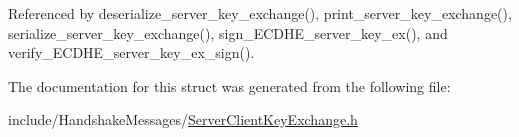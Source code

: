 Referenced by deserialize\+\_\+server\+\_\+key\+\_\+exchange(), print\+\_\+server\+\_\+key\+\_\+exchange(), serialize\+\_\+server\+\_\+key\+\_\+exchange(), sign\+\_\+\+E\+C\+D\+H\+E\+\_\+server\+\_\+key\+\_\+ex(), and verify\+\_\+\+E\+C\+D\+H\+E\+\_\+server\+\_\+key\+\_\+ex\+\_\+sign().



The documentation for this struct was generated from the following file\+:\begin{DoxyCompactItemize}
\item 
include/\+Handshake\+Messages/\hyperlink{_server_client_key_exchange_8h}{Server\+Client\+Key\+Exchange.\+h}\end{DoxyCompactItemize}
